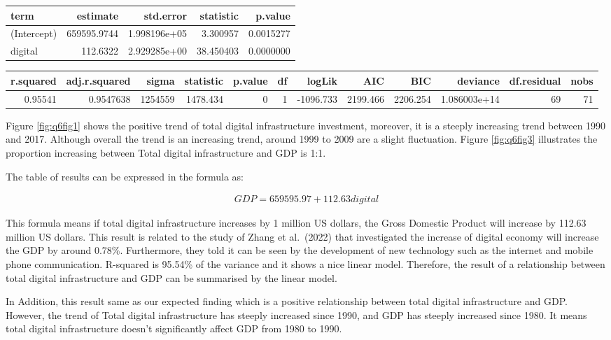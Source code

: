 \documentclass[
]{article}
\begin{document}
\begin{table}
\centering
\begin{tabular}{l|r|r|r|r}
\hline
term & estimate & std.error & statistic & p.value\\
\hline
(Intercept) & 659595.9744 & 1.998196e+05 & 3.300957 & 0.0015277\\
\hline
digital & 112.6322 & 2.929285e+00 & 38.450403 & 0.0000000\\
\hline
\end{tabular}
\end{table}

\begin{table}
\centering
\begin{tabular}{r|r|r|r|r|r|r|r|r|r|r|r}
\hline
r.squared & adj.r.squared & sigma & statistic & p.value & df & logLik & AIC & BIC & deviance & df.residual & nobs\\
\hline
0.95541 & 0.9547638 & 1254559 & 1478.434 & 0 & 1 & -1096.733 & 2199.466 & 2206.254 & 1.086003e+14 & 69 & 71\\
\hline
\end{tabular}
\end{table}

Figure \ref{fig:q6fig1} shows the positive trend of total digital infrastructure investment, moreover, it is a steeply increasing trend between 1990 and 2017. Although overall the trend is an increasing trend, around 1999 to 2009 are a slight fluctuation. Figure \ref{fig:q6fig3} illustrates the proportion increasing between Total digital infrastructure and GDP is 1:1.

The table of results can be expressed in the formula as:

\[
\begin{align*}
{GDP} = 659595.97 + 112.63{digital}
\end{align*}
\]

This formula means if total digital infrastructure increases by 1 million US dollars, the Gross Domestic Product will increase by 112.63 million US dollars. This result is related to the study of Zhang et al.~(2022) that investigated the increase of digital economy will increase the GDP by around 0.78\%. Furthermore, they told it can be seen by the development of new technology such as the internet and mobile phone communication. R-squared is 95.54\% of the variance and it shows a nice linear model. Therefore, the result of a relationship between total digital infrastructure and GDP can be summarised by the linear model.

In Addition, this result same as our expected finding which is a positive relationship between total digital infrastructure and GDP. However, the trend of Total digital infrastructure has steeply increased since 1990, and GDP has steeply increased since 1980. It means total digital infrastructure doesn't significantly affect GDP from 1980 to 1990.
\end{document}

